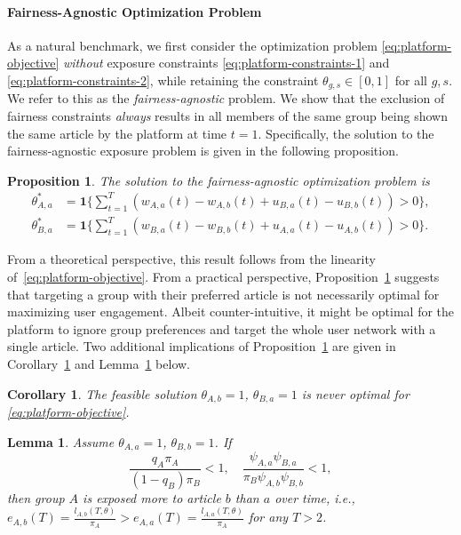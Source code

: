 \documentclass[letterpaper]{article} %
\newtheorem{lemma}{Lemma}
\newtheorem{corollary}{Corollary}
\newtheorem{proposition}{Proposition}
\begin{document}
\paragraph{Fairness-Agnostic Optimization Problem}
As a natural benchmark, we first consider the optimization problem \eqref{eq:platform-objective} \textit{without} exposure constraints \eqref{eq:platform-constraints-1} and \eqref{eq:platform-constraints-2}, while retaining the constraint $\theta_{g,s} \in [0,1]$ for all $g,s$.
%
We refer to this as the \emph{fairness-agnostic} problem.
%
We show that the exclusion of fairness constraints \emph{always} results in all members of the same group being shown the same article by the platform  at time $t=1$.
%
Specifically, the solution to the fairness-agnostic exposure problem is given in the following proposition.

\begin{proposition}
\label{prop:unconstrained_optimization}
The solution to the fairness-agnostic optimization problem is
\footnotesize
\begin{align*}
    \theta_{A,a}^* &=  \mathbf{1} \Big\{ \sum_{t=1}^T \left(w_{A,a}(t) - w_{A,b}(t) + u_{B,a}(t) - u_{B,b}(t)\right) > 0 \Big\}, \\
    \theta_{B,a}^* &=  \mathbf{1} \Big\{\sum_{t=1}^T \left( w_{B,a}(t) - w_{B,b}(t) + u_{A,a}(t) - u_{A,b}(t)\right) > 0 \Big\}.
\end{align*}
\normalsize
\end{proposition}
%
From a theoretical perspective, this result follows from the linearity of~\eqref{eq:platform-objective}.
%
From a practical perspective, Proposition~\ref{prop:unconstrained_optimization} suggests that targeting a group with their preferred article is not necessarily optimal for maximizing user engagement.
%
Albeit counter-intuitive, it might be optimal for the platform to ignore group preferences and target the whole user network with a single article.
%
Two additional implications of Proposition~\ref{prop:unconstrained_optimization} are given in Corollary~\ref{cor:feasible_never_optimal} and Lemma~\ref{lemma:condition_for_higher_intergroup_exposure} below. 

\begin{corollary}\label{cor:feasible_never_optimal}
The feasible solution $\theta_{A,b}=1$, $\theta_{B,a}=1$ is never optimal for \eqref{eq:platform-objective}.
\end{corollary}

\begin{lemma}\label{lemma:condition_for_higher_intergroup_exposure}
Assume $\theta_{A,a} = 1$, $\theta_{B,b}=1$. If
\footnotesize
\begin{equation}
\label{eq:conditions_A_more_exposed_to_b}
    \frac{q_A \pi_A  }{(1-q_B) \pi_B} <1,\quad  \frac{\psi_{A,a} \psi_{B,a}}{\pi_B \psi_{A,b} \psi_{B,b}}<1,
\end{equation}
\normalsize
then group $A$ is exposed more to article $b$ than $a$ over time, i.e., $e_{A,b}(T) = \frac{l_{A,b}(T,\theta)}{\pi_A} > e_{A,a}(T) = \frac{l_{A,a}(T,\theta)}{\pi_A}$ for any $T>2$. 
\end{lemma}
\end{document}
